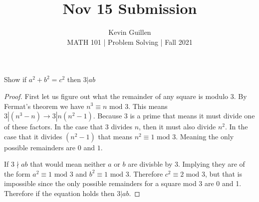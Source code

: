 \documentclass[11pt]{article}
\newenvironment{problem}[2][Problem\!]{\begin{trivlist}
\item[\hskip \labelsep {\bfseries #1}\hskip \labelsep {\bfseries #2}]}{\end{trivlist}}
\begin{document}
 
\title{Nov 15 Submission}
\author{Kevin Guillen\\[0.5em]
MATH 101 | Problem Solving | Fall 2021}
\date{} 
\maketitle


\begin{tcolorbox}
  \begin{problem} {IC | 11/10 | 135.} Show if $a^{2} + b^{2} = c^{2}$ then $3| ab$
  \end{problem}
\end{tcolorbox}
\begin{proof}
  First let us figure out what the remainder of any square is modulo 3. By Fermat's theorem we have $n^{3} \equiv n \text{ mod }3$. This means $3|(n^{3}-n)\rightarrow 3|n(n^{2}-1)$. Because 3 is a prime that means it must divide one of these factors. In the case that 3 divides $n$, then it must also divide $n^{2}$. In the case that it divides $(n^{2}-1)$ that means $n^{2}\equiv 1 \text{ mod }3$. Meaning the only possible remainders are $0$ and $1$. 

  If $3 \nmid ab$ that would mean neither $a$ or $b$ are divisble by $3$. Implying they are of the form $a^{2} \equiv 1\text{ mod }3$ and $b^{2} \equiv 1\text{ mod }3$. Therefore $c^{2} \equiv 2 \text{ mod } 3$, but that is impossible since the only possible remainders for a square mod 3 are 0 and 1. Therefore if the equation holds then $3|ab$.
\end{proof}
\end{document}
